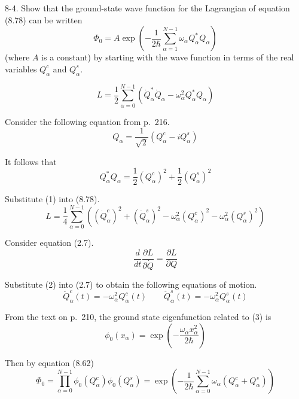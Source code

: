 \documentclass[12pt]{article}
\begin{document}
8-4.
Show that the ground-state wave function for the Lagrangian of
equation (8.78) can be written
\begin{equation*}
\Phi_0=A\exp\left(
-\frac{1}{2\hbar}
\sum_{\alpha=1}^{N-1}
\omega_\alpha Q_\alpha^*Q_\alpha
\right)
\tag{8.83}
\end{equation*}
(where $A$ is a constant) by starting with the wave function in terms of
the real variables $Q_\alpha^c$ and $Q_\alpha^s$.

\begin{equation*}
L=\frac{1}{2}\sum_{\alpha=0}^{N-1}
\left(\dot Q_\alpha^*\dot Q_\alpha-\omega_\alpha^2Q_\alpha^*Q_\alpha\right)
\tag{8.78}
\end{equation*}

Consider the following equation from p.~216.
\begin{equation*}
Q_\alpha=\frac{1}{\sqrt2}(Q_\alpha^c-iQ_\alpha^s)
\end{equation*}

It follows that
\begin{equation*}
Q_\alpha^*Q_\alpha
=\frac{1}{2}(Q_\alpha^c)^2+\frac{1}{2}(Q_\alpha^s)^2
\tag{1}
\end{equation*}

Substitute (1) into (8.78).
\begin{equation*}
L=\frac{1}{4}\sum_{\alpha=0}^{N-1}
\left(
(\dot Q_\alpha^c)^2
+(\dot Q_\alpha^s)^2
-\omega_\alpha^2(Q_\alpha^c)^2
-\omega_\alpha^2(Q_\alpha^s)^2
\right)
\tag{2}
\end{equation*}

Consider equation (2.7).
\begin{equation*}
\frac{d}{dt}\frac{\partial L}{\partial\dot Q}=\frac{\partial L}{\partial Q}
\tag{2.7}
\end{equation*}

Substitute (2) into (2.7) to obtain the following equations of motion.
\begin{equation*}
\ddot Q_\alpha^c(t)=-\omega_\alpha^2Q_\alpha^c(t)
\qquad
\ddot Q_\alpha^s(t)=-\omega_\alpha^2Q_\alpha^s(t)
\tag{3}
\end{equation*}

From the text on p.~210, the ground state eigenfunction related to (3) is
\begin{equation*}
\phi_0(x_\alpha)=\exp\left(-\frac{\omega_\alpha x_\alpha^2}{2\hbar}\right)
\end{equation*}

Then by equation (8.62)
\begin{equation*}
\Phi_0=\prod_{\alpha=0}^{N-1}\phi_0(Q_\alpha^c)\phi_0(Q_\alpha^s)
=\exp\left(-\frac{1}{2\hbar}\sum_{\alpha=0}^{N-1}\omega_\alpha(Q_\alpha^c+Q_\alpha^s)\right)
\end{equation*}
\end{document}
